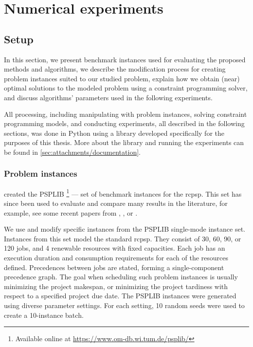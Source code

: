 \chapter{Numerical experiments} \label{chap:numerical-experiments}

\section{Setup} \label{sec:numerical-experiments/setup}

In this section, we present benchmark instances used for evaluating the proposed methods and algorithms,
we describe the modification process for creating problem instances suited to our studied problem,
explain how we obtain (near) optimal solutions to the modeled problem using a constraint programming solver,
and discuss algorithms' parameters used in the following experiments.

All processing, including manipulating with problem instances, solving constraint programming models,
and conducting experiments, all described in the following sections, was done in Python using a library
developed specifically for the purposes of this thesis.
More about the library and running the experiments can be found in \cref{sec:attachments/documentation}.

\subsection{Problem instances} \label{subsec:numerical-experiments/setup/instances}

\citet{Kolisch1997} created the PSPLIB%
\footnote{Available online at \url{https://www.om-db.wi.tum.de/psplib/}}
--- set of benchmark instances for the \ac{rcpsp}.
This set has since been used to evaluate and compare many results in the literature,
for example, see some recent papers from \citet{Bianco2011}, \citet{Cheng2015}, or \citet{Elsayed2017}.

We use and modify specific instances from the PSPLIB single-mode instance set.
Instances from this set model the standard \ac{rcpsp}.
They consist of 30, 60, 90, or 120 jobs,
and 4 renewable resources with fixed capacities.
Each job has an execution duration and consumption requirements for each of the resources defined.
Precedences between jobs are stated, forming a single-component precedence graph.
The goal when scheduling such problem instances is usually minimizing the project makespan,
or minimizing the project tardiness with respect to a specified project due date.
The PSPLIB instances were generated using diverse parameter settings.
For each setting, 10 random seeds were used to create a 10-instance batch.


